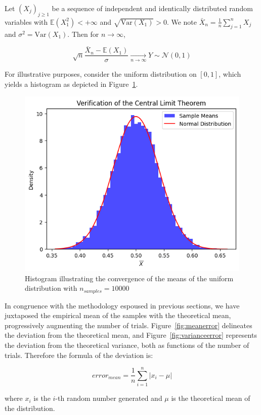\documentclass{report}
\begin{document}
\begin{theorem}
	Let $(X_j)_{j \geq 1}$ be a sequence of independent and identically distributed random variables with $\mathbb{E}(X_1^2) < + \infty$ and $\sqrt{\mathrm{Var}(X_1)} > 0$. We note $\bar{X}_n = \frac{1}{n} \sum_{j=1}^n X_j$ and $\sigma^2 = \mathrm{Var}(X_1)$. Then for $n \to \infty$,

	\begin{equation}
		\sqrt{n} \frac{\bar{X}_n - \mathbb{E}(X_1)}{\sigma} \xrightarrow[n \to \infty]{} Y \sim  \mathcal{N}(0,1)
	\end{equation}
\end{theorem}

For illustrative purposes, consider the uniform distribution on \([0,1]\), which yields a histogram as depicted in Figure~\ref{fig:verificationclt}.

\begin{figure}[H]
	\centering
	\includegraphics[width=0.5\linewidth]{./Figures/CLT/verif.png}
	\caption{Histogram illustrating the convergence of the means of the uniform distribution with $n_{samples} = 10000$}
	\label{fig:verificationclt}
\end{figure}

In congruence with the methodology espoused in previous sections, we have juxtaposed the empirical mean of the samples with the theoretical mean, progressively augmenting the number of trials. Figure~\ref{fig:meanerror} delineates the deviation from the theoretical mean, and Figure~\ref{fig:varianceerror} represents the deviation from the theoretical variance, both as functions of the number of trials. Therefore the formula of the deviation is:

\begin{equation*} error_{mean} = \frac{1}{n}\sum_{i=1}^{n} | x_i - \mu | \end{equation*}

where \(x_i\) is the \(i\)-th random number generated and \(\mu\) is the theoretical mean of the distribution.
\end{document}
